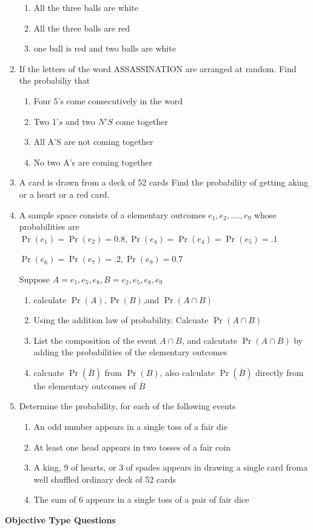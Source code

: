 \documentclass[12pt]{article}
\providecommand{\pr}[1]{\ensuremath{\Pr\left(#1\right)}}
\begin{document}
\begin{enumerate}
\begin{enumerate}
\item All the three balls are white
\item All the three balls are red
\item one ball is red and two balls are white
	\end{enumerate}
\item If the letters of the word ASSASSINATION are arranged at  random. Find the probabiliy that
\begin{enumerate}
\item Four 5's come consecutively in the word
\item Two 1'$s$ and two $N' S$  come together
\item All A'S are not coming together
\item No two A's are coming together
	\end{enumerate}
\item A card is drawn from a deck of 52 cards Find the probability of getting aking or a heart or a red card.
\item A sample space consists of a elementary outcomes $e_1,e_2,....,e_9$ whose probabilities are
 $\pr{e_1}=\pr{e_2}=0.8,\pr{e_4}=\pr{e_4}=\pr{e_5}=.1$

$\pr{e_6}=\pr{e_7}=.2,\pr{e_9}=0.7$

Suppose $A={e_1,e_5,e_8},B={e_2,e_5,e_8,e_9}$
\begin{enumerate}
\item calculate $\pr {A},\pr{B}$,and $\pr {A\cap B}$
\item Using the addition law of probability. Calcuate $\pr {A\cap B}$
\item List the composition of the event $A\cap B$, and calcutate $\pr {A\cap B}$ by adding the probabilities of the elementary outcomes
\item calcuate $\pr {\overline{B}}$ from $\pr {B}$, also calculate $\pr {\overline{B}}$ directly from the elementary outcomes of $\overline{B}$
\end{enumerate}
\item Determine the probability, for each of the following events 
	\begin{enumerate}
\item An odd number appears in a single toss of a fair die
\item At least one head appears in two tosses of a fair coin 
\item A king, 9 of hearts, or 3 of spades appears in drawing a single card froma well shuffled ordinary deck of 52 cards
\item The sum of 6 appears in a single toss of a pair of fair dice
	\end{enumerate}
	\end{enumerate}
\textbf{Objective Type Questions}
\end{document}
